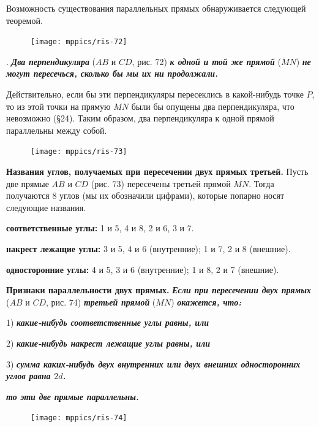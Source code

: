 \documentclass[oneside]{book}
\begin{document}
Возможность существования параллельных прямых обнаруживается следующей теоремой.

\begin{figure}
\centering
\texttt{[image: mppics/ris-72]}
\caption{}
\end{figure}

.
\textbf{\emph{Два перпендикуляра}} ($AB$ и $CD$, рис. 72) \textbf{\emph{к одной и той же прямой}} ($MN$) \textbf{\emph{не могут пересечься, сколько бы мы их ни продолжали.}}

Действительно, если бы эти перпендикуляры пересеклись в какой-нибудь точке $P$, то из этой точки на прямую $MN$ были бы опущены два перпендикуляра, что невозможно (§24).
Таким образом, два перпендикуляра к одной прямой параллельны между собой.

\begin{figure}
\centering
\texttt{[image: mppics/ris-73]}
\caption{}
\end{figure}

\textbf{Названия углов, получаемых при пересечении двух прямых третьей.}
Пусть две прямые $AB$ и $CD$ (рис. 73) пересечены третьей прямой $MN$.
Тогда получаются 8 углов (мы их обозначили цифрами), которые попарно носят следующие названия.

\textbf{соответственные углы:}
1 и 5, 4 и 8, 2 и 6, 3 и 7.

\textbf{накрест лежащие углы:}
3 и 5, 4 и 6 (внутренние);
1 и 7, 2 и 8 (внешние).

\textbf{односторонние углы:}
4 и 5, 3 и 6 (внутренние);
1 и 8, 2 и 7 (внешние).

\textbf{Признаки параллельности двух прямых.}
\textbf{\emph{Если при пересечении двух прямых}} ($AB$ и $CD$, рис. 74) \textbf{\emph{третьей прямой}} ($MN$) \textbf{\emph{окажется, что:}}

1) \textbf{\emph{какие-нибудь соответственные углы равны, или}}

2) \textbf{\emph{какие-нибудь накрест лежащие углы равны, или}}

3) \textbf{\emph{сумма каких-нибудь двух внутренних или двух внешних односторонних углов равна $2d$.}}

\noindent\textbf{\emph{то эти две прямые параллельны.}}

\begin{figure}[h!]
\centering
\texttt{[image: mppics/ris-74]}
\caption{}
\end{figure}
\end{document}
